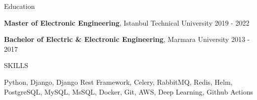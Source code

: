 \documentclass{resume} %
\begin{document}

\begin{rSection}{Education}

{\bf Master of Electronic Engineering}, Istanbul Technical University \hfill {2019 - 2022}

{\bf Bachelor of Electric \& Electronic Engineering}, Marmara University \hfill {2013 - 2017}


\end{rSection}

\begin{rSection}{SKILLS}

Python, Django, Django Rest Framework, Celery, RabbitMQ, Redis, Helm, PostgreSQL, MySQL, MsSQL, Docker, Git, AWS, Deep Learning, Github Actions


\end{rSection}
\end{document}
